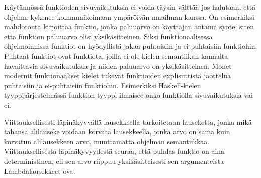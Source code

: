 

\par
Käytännössä funktioden sivuvaikutuksia ei voida täysin välttää jos halutaan, että ohjelma kykenee kommunikoimaan ympäröivän maailman kanssa. On esimerkiksi mahdotonta kirjoittaa funktio, jonka paluuarvo on käyttäjän antama syöte, siten että funktion paluuarvo olisi yksikäsitteinen. Siksi funktionaalisessa ohjelmoinnissa funktiot on hyödyllistä jakaa puhtaisiin ja ei-puhtaisiin funktiohin. Puhtaat funktiot ovat funktiota, joilla ei ole kielen semantiikan kannalta havaittavia sivuvaikutuksia ja niiden paluuarvo on yksikäsitteinen. Monet modernit funktionaaliset kielet tukevat funktioiden explisiittistä jaottelua puhtaisiin ja ei-puhtaisiin funktiohin. Esimerkiksi Haskell-kielen tyyppijärjestelmässä funktion tyyppi ilmaisee onko funktiolla sivuvaikutuksia vai ei. 
\par

\par

Viittauksellisesti läpinäkyvvällä lausekkeella tarkoitetaan lauseketta, jonka mikä tahansa alilauseke voidaan korvata lausekkeella, jonka arvo on sama kuin korvatun alilausekkeen arvo, muuttamatta ohjelman semantiikkaa. Viittauksellisesta läpinäkyvyydestä seuraa, että puhdas funktio on aina deterministinen, eli sen arvo riippuu yksikäsitteisesti sen argumenteista
 Lambdalausekkeet ovat 